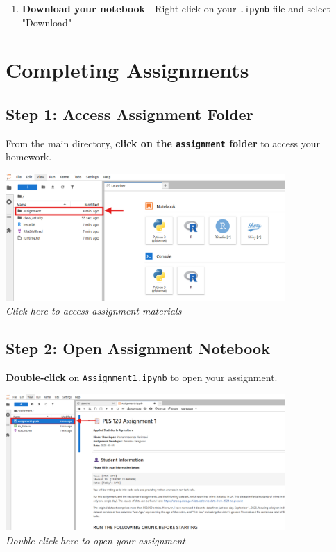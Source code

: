 \documentclass[11pt,a4paper]{article}
\begin{document}
\begin{enumerate}[resume]
    \item \textbf{Download your notebook} - Right-click on your \texttt{.ipynb} file and select "Download"
\end{enumerate}

\section{Completing Assignments}

\subsection{Step 1: Access Assignment Folder}

From the main directory, \textbf{click on the \texttt{assignment} folder} to access your homework.

\begin{center}
\includegraphics[width=0.8\textwidth]{../Image_7.png}\\
\textit{Click here to access assignment materials}
\end{center}

\subsection{Step 2: Open Assignment Notebook}

\textbf{Double-click} on \texttt{Assignment1.ipynb} to open your assignment.

\begin{center}
\includegraphics[width=0.8\textwidth]{../Image_8.png}\\
\textit{Double-click here to open your assignment}
\end{center}
\end{document}
